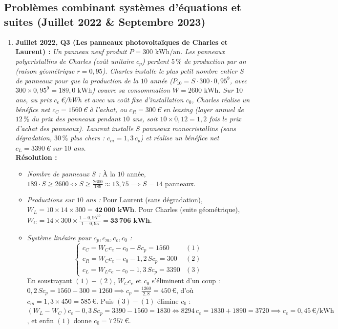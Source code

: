 \subsection{Problèmes combinant systèmes d'équations et suites (Juillet 2022 \& Septembre 2023)}

\begin{exemple}
\begin{enumerate}
    \item \textbf{Juillet 2022, Q3 (Les panneaux photovoltaïques de Charles et Laurent) :}
    \emph{Un panneau neuf produit $P = 300\text{ kWh/an}$. Les panneaux polycristallins de Charles (coût unitaire $c_p$) perdent $5\,\%$ de production par an (raison géométrique $r = 0,95$). Charles installe le plus petit nombre entier $S$ de panneaux pour que la production de la $10$\ieme{} année ($P_{10} = S \cdot 300 \cdot 0,95^9$, avec $300 \times 0,95^9 = 189,0\text{ kWh}$) couvre sa consommation $W = 2600\text{ kWh}$. Sur $10$ ans, au prix $c_e$\,€/kWh et avec un coût fixe d'installation $c_0$, Charles réalise un bénéfice net $c_C = 1560$\,€ à l'achat, ou $c_R = 300$\,€ en leasing (loyer annuel de $12\,\%$ du prix des panneaux pendant $10$ ans, soit $10 \times 0,12 = 1,2$ fois le prix d'achat des panneaux). Laurent installe $S$ panneaux monocristallins (sans dégradation, $30\,\%$ plus chers : $c_m = 1,3\,c_p$) et réalise un bénéfice net $c_L = 3390$\,€ sur $10$ ans.}\\
    \textbf{Résolution :}
    \begin{itemize}
        \item \emph{Nombre de panneaux $S$ :} À la $10$\ieme{} année, $189 \cdot S \ge 2600 \iff S \ge \frac{2600}{189} \approx 13,75 \implies \boxed{S = 14\text{ panneaux}}$.
        \item \emph{Productions sur $10$ ans :} Pour Laurent (sans dégradation), $W_L = 10 \times 14 \times 300 = \mathbf{42\,000\text{ kWh}}$. Pour Charles (suite géométrique), $W_C = 14 \times 300 \times \frac{1 - 0,95^{10}}{1 - 0,95} = \mathbf{33\,706\text{ kWh}}$.
        \item \emph{Système linéaire pour $c_p, c_m, c_e, c_0$ :}
        \[
            \begin{cases}
                c_C = W_C c_e - c_0 - S c_p = 1560 & (1) \\
                c_R = W_C c_e - c_0 - 1,2\,S c_p = 300 & (2) \\
                c_L = W_L c_e - c_0 - 1,3\,S c_p = 3390 & (3)
            \end{cases}
        \]
        En soustrayant $(1) - (2)$, $W_C c_e$ et $c_0$ s'éliminent d'un coup : $0,2\,S c_p = 1560 - 300 = 1260 \implies c_p = \frac{1260}{2,8} = \boxed{450\,\text{€}}$, d'où $c_m = 1,3 \times 450 = \boxed{585\,\text{€}}$.
        Puis $(3) - (1)$ élimine $c_0$ : $(W_L - W_C)c_e - 0,3\,S c_p = 3390 - 1560 = 1830 \iff 8294\,c_e = 1830 + 1890 = 3720 \implies c_e = \boxed{0,45\,\text{€/kWh}}$, et enfin $(1)$ donne $c_0 = \boxed{7\,257\,\text{€}}$.
    \end{itemize}


\end{enumerate}
\end{exemple}
